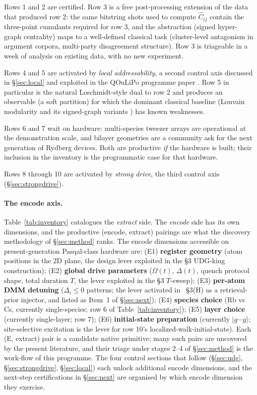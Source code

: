 \documentclass[10pt]{article}
\begin{document}
Rows 1 and 2 are certified. Row 3 is a free post-processing extension of the data that produced row 2: the same bitstring shots used to compute $\hat C_{ij}$ contain the three-point cumulants required for row 3, and the abstraction (signed hyper-graph centrality) maps to a well-defined classical task (cluster-level antagonism in argument corpora, multi-party disagreement structure). Row 3 is triageable in a week of analysis on existing data, with no new experiment.

Rows 4 and 5 are activated by \emph{local addressability}, a second control axis discussed in \S\ref{sec:local} and exploited in the QOuLiPo programme paper \cite{jurczak2026qoulipo}. Row 5 in particular is the natural Loschmidt-style dual to row 2 and produces an observable (a soft partition) for which the dominant classical baseline (Louvain modularity and its signed-graph variants \cite{tang2016signedsurvey}) has known weaknesses.

Rows 6 and 7 wait on hardware: multi-species tweezer arrays are operational at the demonstration scale, and bilayer geometries are a community ask for the next generation of Rydberg devices. Both are productive \emph{if} the hardware is built; their inclusion in the inventory is the programmatic case for that hardware.

Rows 8 through 10 are activated by \emph{strong drive}, the third control axis (\S\ref{sec:strongdrive}).

\paragraph{The encode axis.}
Table~\ref{tab:inventory} catalogues the \emph{extract} side. The \emph{encode} side has its own dimensions, and the productive (encode, extract) pairings are what the discovery methodology of \S\ref{sec:method} ranks. The encode dimensions accessible on present-generation Pasqal-class hardware are: (E1) \textbf{register geometry} (atom positions in the 2D plane, the design lever exploited in the §3 UDG-king construction); (E2) \textbf{global drive parameters} ($\Omega(t)$, $\Delta(t)$, quench protocol shape, total duration $T$, the lever exploited in the §3 $T$-sweep); (E3) \textbf{per-atom DMM detuning} ($\Delta_i \leq 0$ patterns; the lever activated in \cite{jurczak2026atomrank}~§3(H) as a retrieval-prior injector, and listed as Item~1 of \S\ref{sec:next}); (E4) \textbf{species choice} (Rb vs Cs, currently single-species; row 6 of Table~\ref{tab:inventory}); (E5) \textbf{layer choice} (currently single-layer; row 7); (E6) \textbf{initial-state preparation} (currently $|g{\cdots}g\rangle$; site-selective excitation is the lever for row 10's localized-walk-initial-state). Each (E, extract) pair is a candidate native primitive; many such pairs are uncovered by the present literature, and their triage under stages 2--4 of \S\ref{sec:method} is the work-flow of this programme. The four control sections that follow (\S\ref{sec:udg}, \S\ref{sec:strongdrive}, \S\ref{sec:local}) each unlock additional encode dimensions, and the next-step certifications in \S\ref{sec:next} are organised by which encode dimension they exercise.
\end{document}

